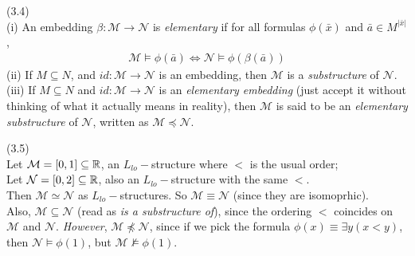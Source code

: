 \documentclass[a4paper]{article}
\begin{document}
\begin{defi} (3.4)\\
    (i) An embedding $\beta: \mathcal{M} \to \mathcal{N}$ is \emph{elementary} if for all formulas $\phi(\bar{x})$ and $\bar{a} \in M^{|\bar{x}|}$,
    \begin{equation*}
        \begin{aligned}
            \mathcal{M} \vDash \phi(\bar{a}) \iff \mathcal{N} \vDash \phi(\beta(\bar{a}))
        \end{aligned}
    \end{equation*}
    (ii) If $M \subseteq N$, and $id:\mathcal{M} \to \mathcal{N}$ is an embedding, then $\mathcal{M}$ is a \emph{substructure} of $\mathcal{N}$.\\
    (iii) If $M \subseteq N$ and $id:\mathcal{M} \to \mathcal{N}$ is an \emph{elementary embedding} (just accept it without thinking of what it actually means in reality), then $\mathcal{M}$ is said to be an \emph{elementary substructure} of $\mathcal{N}$, written as $\mathcal{M} \preccurlyeq \mathcal{N}$.
\end{defi}

\begin{eg} (3.5)\\
    Let $\mathcal{M} = [0,1] \subseteq \mathbb{R}$, an $L_{lo}-$structure where $<$ is the usual order;\\
    Let $\mathcal{N} = [0,2] \subseteq \mathbb{R}$, also an $L_{lo}-$structure with the same $<$.\\
    Then $\mathcal{M} \simeq \mathcal{N}$ as $L_{lo}-$structures. So $\mathcal{M} \equiv \mathcal{N}$ (since they are isomoprhic).\\
    Also, $\mathcal{M} \subseteq \mathcal{N}$ (read as \emph{is a substructure of}), since the ordering $<$ coincides on $\mathcal{M}$ and $\mathcal{N}$. \emph{However}, $\mathcal{M} \not\preccurlyeq \mathcal{N}$, since if we pick the formula $\phi(x) \equiv \exists y (x<y)$, then $\mathcal{N} \vDash \phi(1)$, but $\mathcal{M} \not\vDash \phi(1)$.
\end{eg}
\end{document}
